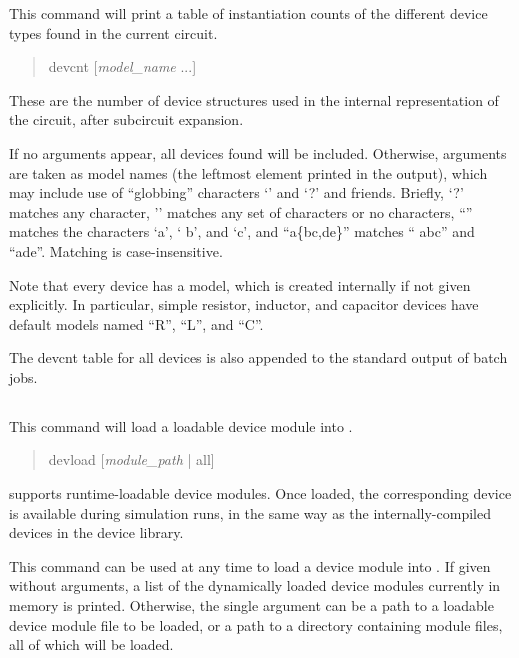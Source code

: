 This command will print a table of instantiation counts of the
different device types found in the current circuit.
\begin{quote} \vt
devcnt [{\it model\_name} ...]
\end{quote}
These are the number of device structures used in the internal
representation of the circuit, after subcircuit expansion.

If no arguments appear, all devices found will be included. 
Otherwise, arguments are taken as model names (the leftmost element
printed in the output), which may include use of ``globbing''
characters `{\vt *}' and `{\vt ?}' and friends.  Briefly, `{\vt ?}'
matches any character, '{\vt *}' matches any set of characters or no
characters, ``{\vt [abc]}'' matches the characters `{\vt a}', `{\vt
b}', and `{\vt c}', and ``{\vt a}\{{\vt bc,de}\}'' matches ``{\vt
abc}'' and ``{\vt ade}''.  Matching is case-insensitive.

Note that every device has a model, which is created internally if not
given explicitly.  In particular, simple resistor, inductor, and
capacitor devices have default models named ``{\vt R}'', ``{\vt L}'',
and ``{\vt C}''.

The {\cb devcnt} table for all devices is also appended to the
standard output of batch jobs.

\subsection{}
\label{devload}


This command will load a loadable device module into {\WRspice}.
\begin{quote}\vt
devload [{\it module\_path\/} | {\vt all}]
\end{quote}

{\WRspice} supports runtime-loadable device modules.  Once loaded, the
corresponding device is available during simulation runs, in the same
way as the internally-compiled devices in the device library.

This command can be used at any time to load a device module into
{\WRspice}.  If given without arguments, a list of the dynamically
loaded device modules currently in memory is printed.  Otherwise, the
single argument can be a path to a loadable device module file to be
loaded, or a path to a directory containing module files, all of which
will be loaded.

